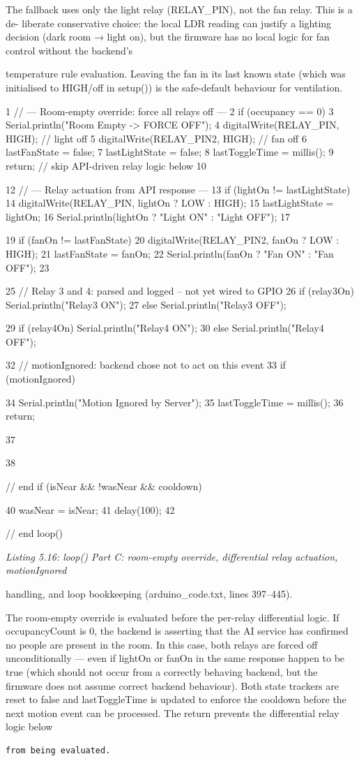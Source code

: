 {{The fallback uses only the light relay (RELAY\_PIN), not the fan relay. This is a de-
liberate conservative choice: the local LDR reading can justify a lighting decision (dark
room → light on), but the ﬁrmware has no local logic for fan control without the backend's



temperature rule evaluation. Leaving the fan in its last known state (which was initialised
to HIGH/off in setup()) is the safe-default behaviour for ventilation.


1 // --- Room-empty override: force all relays off ---
2 if (occupancy == 0) {
3 Serial.println("Room Empty -> FORCE OFF");
4 digitalWrite(RELAY\_PIN, HIGH); // light off
5 digitalWrite(RELAY\_PIN2, HIGH); // fan off
6 lastFanState = false;
7 lastLightState = false;
8 lastToggleTime = millis();
9 return; // skip API-driven relay logic below
10 }


12 // --- Relay actuation from API response ---
13 if (lightOn != lastLightState) {
14 digitalWrite(RELAY\_PIN, lightOn ? LOW : HIGH);
15 lastLightState = lightOn;
16 Serial.println(lightOn ? "Light ON" : "Light OFF");
17 }

19 if (fanOn != lastFanState) {
20 digitalWrite(RELAY\_PIN2, fanOn ? LOW : HIGH);
21 lastFanState = fanOn;
22 Serial.println(fanOn ? "Fan ON" : "Fan OFF");
23 }

25 // Relay 3 and 4: parsed and logged -- not yet wired to GPIO
26 if (relay3On) Serial.println("Relay3 ON");
27 else Serial.println("Relay3 OFF");

29 if (relay4On) Serial.println("Relay4 ON");
30 else Serial.println("Relay4 OFF");

32 // motionIgnored: backend chose not to act on this event
33 if (motionIgnored) {
34 Serial.println("Motion Ignored by Server");
35 lastToggleTime = millis();
36 return;




37 }
38 } // end if (isNear \&\& !wasNear \&\& cooldown)


40 wasNear = isNear;
41 delay(100);
42 } // end loop()



\textit{Listing 5.16: loop() Part C: room-empty override, differential relay actuation, motionIgnored}

handling, and loop bookkeeping (arduino\_code.txt, lines 397--445).



The room-empty override is evaluated before the per-relay differential logic. If occupancyCount
is 0, the backend is asserting that the AI service has conﬁrmed no people are present in the
room. In this case, both relays are forced off unconditionally --- even if lightOn or fanOn
in the same response happen to be true (which should not occur from a correctly behaving
backend, but the ﬁrmware does not assume correct backend behaviour). Both state trackers
are reset to false and lastToggleTime is updated to enforce the cooldown before the
next motion event can be processed. The return prevents the differential relay logic below
\begin{lstlisting}
from being evaluated.

\end{lstlisting}

